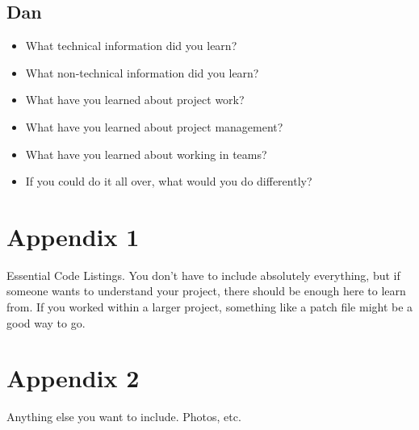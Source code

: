 \documentclass{article}
\begin{document}
\subsection{Dan}
\begin{itemize}
    \item What technical information did you learn?
    \item What non-technical information did you learn?
    \item What have you learned about project work?
    \item What have you learned about project management?
    \item What have you learned about working in teams?
    \item If you could do it all over, what would you do differently?
\end{itemize}

\section{Appendix 1}
Essential Code Listings. You don't have to include absolutely everything, but if someone wants to understand your project, there should be enough here to learn from. If you worked within a larger project, something like a patch file might be a good way to go.

\section{Appendix 2}
Anything else you want to include. Photos, etc.
\end{document}
